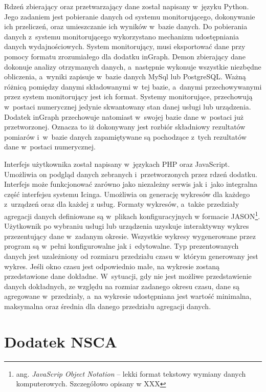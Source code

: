 Rdzeń zbierający oraz przetwarzający dane został napisany w~języku
Python. Jego zadaniem jest pobieranie danych od systemu
monitorującego, dokonywanie ich przeliczeń, oraz umieszczanie ich
wyników w~bazie danych. Do pobierania danych z~systemu monitorującego
wykorzystano mechanizm udostępniania danych wydajnościowych. System
monitorujący, musi eksportować dane przy pomocy formatu zrozumiałego
dla dodatku inGraph. Demon zbierający dane dokonuje analizy otrzymanych
danych, a~następnie wykonuje wszystkie niezbędne obliczenia, a~wyniki
zapisuje w~bazie danych MySql lub PostgreSQL. Ważną różnicą pomiędzy
danymi składowanymi w~tej bazie, a~danymi przechowywanymi przez system
monitorujący jest ich format. Systemy monitorujące, przechowują
w~postaci numerycznej jedynie skwantowany stan danej usługi lub
urządzenia. Dodatek inGraph przechowuje natomiast w~swojej bazie dane
w~postaci już przetworzonej. Oznacza to iż dokonywany jest rozbiór
składniowy rezultatów pomiarów i~w~bazie danych zapamiętywane są
pochodzące z~tych rezultatów dane w~postaci numerycznej.

Interfejs użytkownika został napisany w~językach PHP oraz
JavaScript. Umożliwia on podgląd danych zebranych i~przetworzonych
przez rdzeń dodatku. Interfejs może funkcjonować zarówno jako
niezależny serwis jak i~jako integralna część interfejsu systemu
Icinga. Umożliwia on generację wykresów dla każdego z~urządzeń oraz
dla każdej z usług. Formaty wykresów, a~także przedziały agregacji
danych definiowane są w~plikach konfiguracyjnych w formacie
JASON\footnote{ang. {\em JavaScrip Object Notation} -- lekki format
  tekstowy wymiany danych komputerowych. Szczegółowo opisany w XXX}.
Użytkownik po wybraniu usługi lub urządzenia uzyskuje interaktywny
wykres przezentujący dane w~zadanym okresie. Wszystkie wykresy
wygenerowane przez program są w~pełni konfigurowalne jak
i~edytowalne. Typ prezentowanych danych jest uzależniony od rozmiaru
przedziału czasu w~którym generowany jest wykres. Jeśli okno czasu
jest odpowiednio małe, na wykresie zostaną przedstawione dane
dokładne. W~sytuacji, gdy nie jest możliwe przedstawienie danych
dokładnych, ze względu na rozmiar zadanego okresu czasu, dane są
agregowane w~przedziały, a~na wykresie udostępniana jest wartość
minimalna, maksymalna oraz średnia dla danego przedziału agregacji
danych.


\section[Dodatek NSCA][Dodatek NSCA]{Dodatek NSCA}
\label{sec:NSCA}

